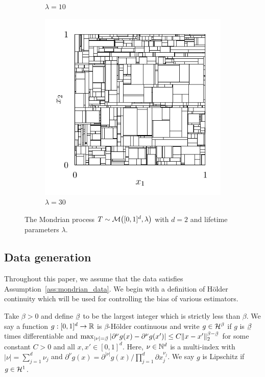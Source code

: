 \begin{figure}[ht]
\begin{subfigure}{0.32\textwidth}
    \caption{$\lambda = 10$}
  \end{subfigure}
  \begin{subfigure}{0.32\textwidth}
    \centering
    \includegraphics[scale=0.64]{graphics/plot_mondrian_process_3.pdf}
    \caption{$\lambda = 30$}
  \end{subfigure}
  \caption{The Mondrian process $T \sim \mathcal{M} \big( [0,1]^d, \lambda \big)$ with
  $d=2$ and lifetime parameters $\lambda$.}
  \label{fig:mondrian_process}
\end{figure}

\subsection{Data generation}

Throughout this paper, we assume that the data satisfies
Assumption~\ref{ass:mondrian_data}. We begin with a definition of H{\"o}lder
continuity which will be used for controlling the bias of various estimators.

\begin{definition}%

  Take $\beta > 0$ and define $\flbeta$ to be the largest integer which is
  strictly less than $\beta$. We say a function $g: [0,1]^d \to \mathbb{R}$ is
  $\beta$-H{\"o}lder continuous and write $g \in \mathcal{H}^\beta$ if $g$ is $\flbeta$
  times differentiable and
  $\max_{|\nu| = \flbeta}
  \left| \partial^\nu g(x) - \partial^{\nu} g(x') \right|
  \leq C \|x-x'\|_2^{\beta - \flbeta}$
  for some constant $C > 0$ and all $x, x' \in [0,1]^d$. Here, $\nu \in \mathbb{N}^d$
  is a multi-index with $|\nu| = \sum_{j=1}^d \nu_j$ and
  $\partial^{\nu} g(x) = \partial^{|\nu|} g(x) \big/
  \prod_{j=1}^d \partial x_j^{\nu_j}$. We say $g$ is Lipschitz if $g \in \mathcal{H}^1$.

\end{definition}

